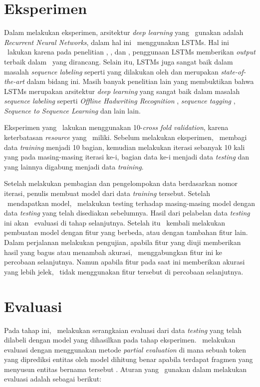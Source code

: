 \section{Eksperimen}
Dalam melakukan eksperimen, arsitektur \textit{deep learning} yang \saya~gunakan adalah \textit{Recurrent Neural Networks}, dalam hal ini \saya~menggunakan LSTMs. Hal ini \saya~lakukan karena pada penelitian \cite{mujiono2016new}, \cite{jagannatha2016bidirectional}, \cite{limsopatham2016learning} dan \cite{almgren2016named}, penggunaan LSTMs memberikan \textit{output} terbaik dalam \mer~yang dirancang. Selain itu, LSTMs juga sangat baik dalam masalah \textit{sequence labeling} seperti yang dilakukan oleh \cite{graves2013speech} dan merupakan \textit{state-of-the-art} dalam bidang ini. Masih banyak penelitian lain yang membuktikan bahwa LSTMs merupakan arsitektur \textit{deep learning} yang sangat baik dalam masalah \textit{sequence labeling} seperti \textit{Offline Hadwriting Recognition} \citep{graves2009offline}, \textit{sequence tagging} \citep{huang2015bidirectional}, \textit{Sequence to Sequence Learning} \citep{NIPS2014_5346} dan lain lain.

Eksperimen yang \saya~lakukan menggunakan 10-\textit{cross fold validation}, karena keterbatasan \textit{resource} yang \saya~miliki. Sebelum melakukan eksperimen, \saya~membagi data \textit{training} menjadi 10 bagian, kemudian melakukan iterasi sebanyak 10 kali yang pada masing-masing iterasi ke-i, bagian data ke-i menjadi data \textit{testing} dan yang lainnya digabung menjadi data \textit{training}. 

Setelah melakukan pembagian dan pengelompokan data berdasarkan nomor iterasi, penulis membuat model dari data \textit{training} tersebut. Setelah \saya~mendapatkan model, \saya~melakukan testing terhadap masing-masing model dengan data \textit{testing} yang telah disediakan sebelumnya. Hasil dari pelabelan data \textit{testing} ini akan \saya~evaluasi di tahap selanjutnya. Setelah itu \saya~kembali melakukan pembuatan model dengan fitur yang berbeda, atau dengan tambahan fitur lain. Dalam perjalanan melakukan pengujian, apabila fitur yang diuji memberikan hasil yang bagus atau menambah akurasi, \saya~menggabungkan fitur ini ke percobaan selanjutnya. Namun apabila fitur pada saat ini memberikan akurasi yang lebih jelek, \saya~tidak menggunakan fitur tersebut di percobaan selanjutnya.

\section{Evaluasi}
Pada tahap ini, \saya~melakukan serangkaian evaluasi dari data \textit{testing} yang telah dilabeli dengan model yang dihasilkan pada tahap eksperimen. \Saya~melakukan evaluasi dengan menggunakan metode \textit{partial evaluation} di mana sebuah token yang diprediksi entitas oleh model dihitung benar apabila terdapat fragmen yang menyusun entitas bernama tersebut \citep{seki2003probabilistic}. Aturan yang \saya~gunakan dalam melakukan evaluasi adalah sebagai berikut: 

